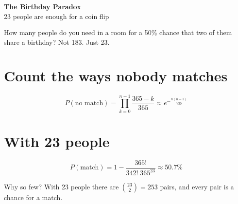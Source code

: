 \documentclass[11pt]{article}
\begin{document}
\begin{center}
  {\LARGE\bfseries The Birthday Paradox}\\[4pt]
  {\large 23 people are enough for a coin flip}
\end{center}

How many people do you need in a room for a 50\% chance
that two of them share a birthday? Not 183. Just 23.

\section*{Count the ways nobody matches}
\[
  P(\text{no match}) = \prod_{k=0}^{n-1} \frac{365 - k}{365}
  \approx e^{-\frac{n(n-1)}{730}}
\]

\section*{With 23 people}
\[
  P(\text{match}) = 1 - \frac{365!}{342!\;365^{23}} \approx 50.7\%
\]

\begin{center}
\end{center}

Why so few? With 23 people there are \(\binom{23}{2} = 253\) pairs,
and every pair is a chance for a match.
\end{document}
